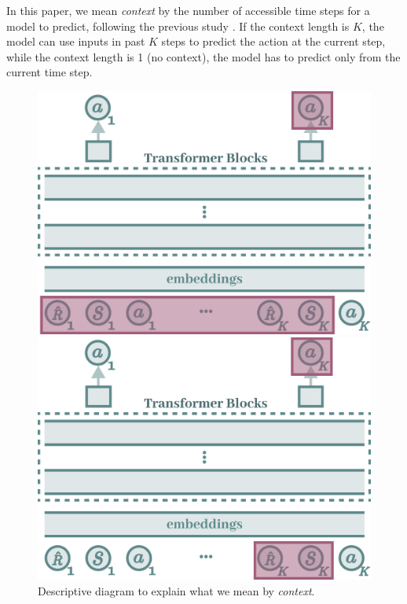 \documentclass{article}
\begin{document}
In this paper, we mean \textit{context} by the number of accessible time steps for a model to predict, following the previous study \cite{chen2021decision}. If the context length is $K$, the model can use inputs in past $K$ steps to predict the action at the current step, while the context length is 1 (no context), the model has to predict only from the current time step. 

\begin{figure}[H]
    \centering
    \begin{minipage}[b]{0.4\linewidth}
    \includegraphics[width=\linewidth]{figs/context_K.pdf}
    \end{minipage}
    \hspace{1cm}
    \begin{minipage}[b]{0.4\linewidth}
    \includegraphics[width=\linewidth]{figs/context_1.pdf}
    \end{minipage}
    \caption{Descriptive diagram to explain what we mean by \textit{context}.}
    \label{fig:diagram_context}
\end{figure}
\end{document}
